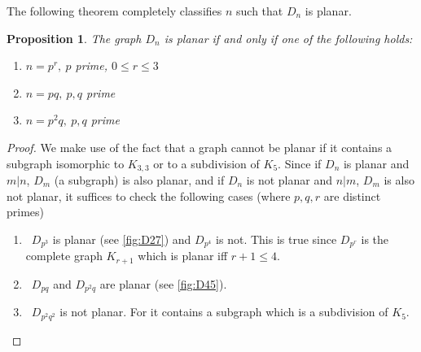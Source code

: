 \documentclass[11pt,a4paper]{amsart}
\newtheorem{prop}[thm]{Proposition}
\theoremstyle{definition}
\numberwithin{equation}{section}
\begin{document}
The following theorem completely classifies $n$ such that $D_n$ is planar. 

\begin{prop}
The graph $D_{n}$ is planar if and only if one of the following holds:
\begin{enumerate}
\item $n = p^{r},\ p$ prime, $0 \leq r \leq 3$ 
\item $n = pq,\ p,q$ prime 
\item $n = p^{2}q,\ p,q$ prime
\end{enumerate}
\end{prop}

\begin{proof}
We make use of the fact that a graph cannot be planar if it contains a
subgraph isomorphic to $K_{3,3}$ or to a subdivision of $K_{5}$.
Since if $D_{n}$ is planar and $m|n$, $D_{m}$ (a subgraph)
is also planar, and if $D_{n}$ is not planar and $n|m$, $D_{m}$ is also not
planar, it suffices to check the following cases (where $p,q,r$ are distinct
primes) 

\begin{enumerate}
\item \ $D_{p^{3}}$ is planar (see \cref{fig:D27}) and $D_{p^{4}}$ is not. 
This is true since $D_{p^{r}}$ is the complete graph $K_{r+1}$ which is
planar iff $r+1 \leq 4$.
\item \ $D_{pq}$ and $D_{p^{2}q}$ are planar (see \cref{fig:D45}). 
\item \ $D_{p^{2}q^{2}}$ is not planar.
For it contains a subgraph which is a subdivision of $K_{5}$.
\begin{center}
\end{center}
\end{enumerate}
\end{proof}
\end{document}
